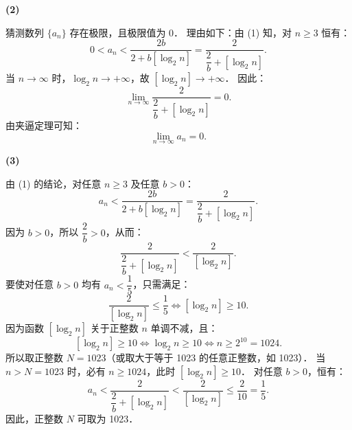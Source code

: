 \begin{answer}
\textbf{(2)}

猜测数列 $\{a_n\}$ 存在极限，且极限值为 0．
理由如下：由 (1) 知，对 $n \geqslant 3$ 恒有：
\nopagebreak[4]
\[
0 < a_n < \frac{2b}{2 + b[\log_2 n]} = \frac{2}{\dfrac{2}{b} + [\log_2 n]}.
\]
当 $n \to \infty$ 时，$\log_2 n \to +\infty$，故 $[\log_2 n] \to +\infty$．
因此：
\nopagebreak[4]
\[
\lim_{n\to\infty} \frac{2}{\dfrac{2}{b} + [\log_2 n]} = 0.
\]
由夹逼定理可知：
\nopagebreak[4]
\[
\lim_{n\to\infty} a_n = 0.
\]

\textbf{(3)}

由 (1) 的结论，对任意 $n \geqslant 3$ 及任意 $b > 0$：
\nopagebreak[4]
\[
a_n < \frac{2b}{2 + b[\log_2 n]} = \frac{2}{\dfrac{2}{b} + [\log_2 n]}.
\]
因为 $b > 0$，所以 $\dfrac{2}{b} > 0$，从而：
\nopagebreak[4]
\[
\frac{2}{\dfrac{2}{b} + [\log_2 n]} < \frac{2}{[\log_2 n]}.
\]
要使对任意 $b > 0$ 均有 $a_n < \dfrac{1}{5}$，只需满足：
\nopagebreak[4]
\[
\frac{2}{[\log_2 n]} \leqslant \frac{1}{5} \iff [\log_2 n] \geqslant 10.
\]
因为函数 $[\log_2 n]$ 关于正整数 $n$ 单调不减，且：
\nopagebreak[4]
\[
[\log_2 n] \geqslant 10 \iff \log_2 n \geqslant 10 \iff n \geqslant 2^{10} = 1024.
\]
所以取正整数 $N = 1023$（或取大于等于 1023 的任意正整数，如 1023）．
当 $n > N = 1023$ 时，必有 $n \geqslant 1024$，此时 $[\log_2 n] \geqslant 10$．
对任意 $b > 0$，恒有：
\nopagebreak[4]
\[
a_n < \frac{2}{\dfrac{2}{b} + [\log_2 n]} < \frac{2}{[\log_2 n]} \leqslant \frac{2}{10} = \frac{1}{5}.
\]
因此，正整数 $N$ 可取为 1023．




\end{answer}